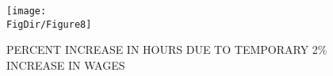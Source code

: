\hypertarget{TempIncrease}{}
\begin{figure}[tbp]
  \centerline{\texttt{[image: \\FigDir/Figure8]}}
  \caption{PERCENT INCREASE IN HOURS DUE TO TEMPORARY 2\% INCREASE IN WAGES}
  \label{fig:TempIncrease}
\end{figure}
